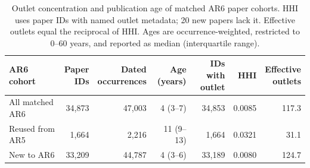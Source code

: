 \begin{table}[htbp]
\centering\small
\caption{Outlet concentration and publication age of matched AR6 paper cohorts. HHI uses paper IDs with named outlet metadata; 20 new papers lack it. Effective outlets equal the reciprocal of HHI. Ages are occurrence-weighted, restricted to 0--60 years, and reported as median (interquartile range).}
\label{tab:cohort_profiles}
\begin{tabular}{@{}lrrrrrr@{}}
\toprule
AR6 cohort & \shortstack{Paper\\IDs} & \shortstack{Dated\\occurrences} & \shortstack{Age\\(years)} & \shortstack{IDs with\\outlet} & HHI & \shortstack{Effective\\outlets} \\
\midrule
All matched AR6 & 34,873 & 47,003 & 4 (3--7) & 34,853 & 0.0085 & 117.3 \\
Reused from AR5 & 1,664 & 2,216 & 11 (9--13) & 1,664 & 0.0321 & 31.1 \\
New to AR6 & 33,209 & 44,787 & 4 (3--6) & 33,189 & 0.0080 & 124.7 \\
\bottomrule
\end{tabular}
\end{table}
